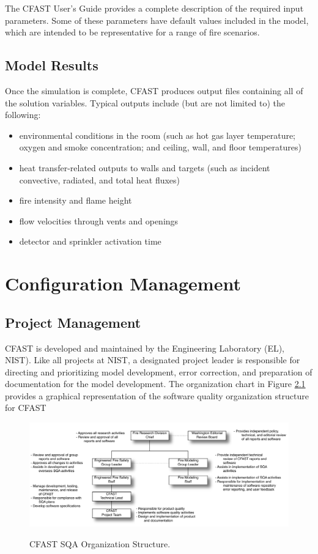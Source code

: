 \documentclass[12pt]{book}
\begin{document}
The CFAST User's Guide \cite{CFAST_Users_Guide_7} provides a complete description of the required input parameters. Some of these parameters have default values included in the model, which are intended to be representative for a range of fire scenarios.

\section{Model Results}

Once the simulation is complete, CFAST produces output files containing all of the solution variables. Typical outputs include (but are not limited to) the following:

\begin{itemize}
\item environmental conditions in the room (such as hot gas layer temperature; oxygen and smoke concentration; and ceiling, wall, and floor temperatures)
\item heat transfer-related outputs to walls and targets (such as incident convective, radiated, and total heat fluxes)
\item fire intensity and flame height
\item flow velocities through vents and openings
\item detector and sprinkler activation time
\end{itemize}

\chapter{Configuration Management}

\section{Project Management}

CFAST is developed and maintained by the Engineering Laboratory (EL), NIST). Like all projects at NIST, a designated project leader is responsible for directing and prioritizing model development, error correction, and preparation of documentation for the model development.  The organization chart in Figure \ref{figOrgChart} provides a graphical representation of the software quality organization structure for CFAST

\begin{figure}
\begin{center}
\includegraphics[width=6.5in]{FIGURES/OrgChart.pdf}\\
\end{center}
\caption{CFAST SQA Organization Structure.}
 \label{figOrgChart}
\end{figure}
\end{document}
